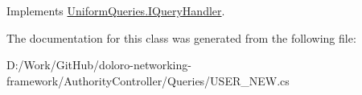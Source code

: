 Implements \mbox{\hyperlink{interface_uniform_queries_1_1_i_query_handler_abda1ccf47ad2889fbd015955965046e7}{Uniform\+Queries.\+I\+Query\+Handler}}.



The documentation for this class was generated from the following file\+:\begin{DoxyCompactItemize}
\item 
D\+:/\+Work/\+Git\+Hub/doloro-\/networking-\/framework/\+Authority\+Controller/\+Queries/U\+S\+E\+R\+\_\+\+N\+E\+W.\+cs\end{DoxyCompactItemize}

